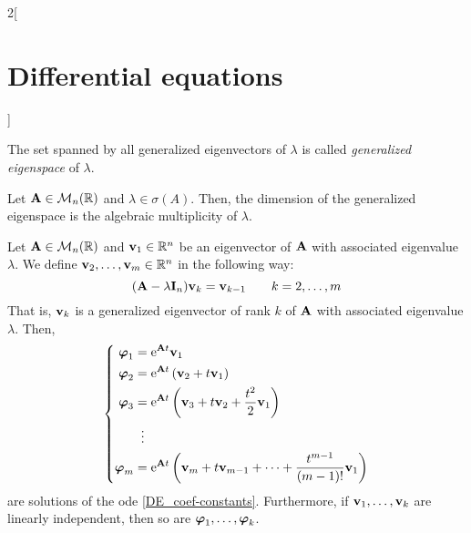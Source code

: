 \documentclass[../../../main.tex]{subfiles}
\begin{document}
\begin{multicols}{2}[\section{Differential equations}]
\begin{definition}
    The set spanned by all generalized eigenvectors of $\lambda$ is called \textit{generalized eigenspace} of $\lambda$.
  \end{definition}
  \begin{prop}
    Let $\boldsymbol{\mathrm{A}}\in\mathcal{M}_n(\mathbb{R})$ and $\lambda\in\sigma(A)$. Then, the dimension of the generalized eigenspace is the algebraic multiplicity of $\lambda$.
  \end{prop}
  \begin{lemma}
    Let $\boldsymbol{\mathrm{A}}\in\mathcal{M}_n(\mathbb{R})$ and $\boldsymbol{\mathrm{v}}_1\in\mathbb{R}^n$ be an eigenvector of $\boldsymbol{\mathrm{A}}$ with associated eigenvalue $\lambda$. We define $\boldsymbol{\mathrm{v}}_2,\ldots,\boldsymbol{\mathrm{v}}_m\in\mathbb{R}^n$ in the following way: $$(\boldsymbol{\mathrm{A}}-\lambda\boldsymbol{\mathrm{I}}_n)\boldsymbol{\mathrm{v}}_k=\boldsymbol{\mathrm{v}}_{k-1}\qquad k=2,\ldots, m$$
    That is, $\boldsymbol{\mathrm{v}}_k$ is a generalized eigenvector of rank $k$ of $\boldsymbol{\mathrm{A}}$ with associated eigenvalue $\lambda$. Then,
    $$
      \left\{
      \begin{aligned}
        \boldsymbol{\mathrm{\varphi}}_1 & =\mathrm{e}^{\boldsymbol{\mathrm{A}}t}\boldsymbol{\mathrm{v}}_1                                                                                          \\
        \boldsymbol{\mathrm{\varphi}}_2 & =\mathrm{e}^{\boldsymbol{\mathrm{A}}t}\left(\boldsymbol{\mathrm{v}}_2+t\boldsymbol{\mathrm{v}}_1\right)                                                       \\
        \boldsymbol{\mathrm{\varphi}}_3 & =\mathrm{e}^{\boldsymbol{\mathrm{A}}t}\left(\boldsymbol{\mathrm{v}}_3+t\boldsymbol{\mathrm{v}}_2+\frac{t^2}{2}\boldsymbol{\mathrm{v}}_1\right)                     \\
                                   & \;\;\vdots                                                                                                                              \\
        \boldsymbol{\mathrm{\varphi}}_m & =\mathrm{e}^{\boldsymbol{\mathrm{A}}t}\left(\boldsymbol{\mathrm{v}}_m+t\boldsymbol{\mathrm{v}}_{m-1}+\cdots+\frac{t^{m-1}}{(m-1)!}\boldsymbol{\mathrm{v}}_1\right) \\
      \end{aligned}
      \right.
    $$
    are solutions of the ode \eqref{DE_coef-constants}. Furthermore, if $\boldsymbol{\mathrm{v}}_1,\ldots,\boldsymbol{\mathrm{v}}_k$ are linearly independent, then so are $\boldsymbol{\mathrm{\varphi}}_1,\ldots,\boldsymbol{\mathrm{\varphi}}_k$.
  \end{lemma}
  \begin{corollary}

\end{corollary}
\end{multicols}
\end{document}
